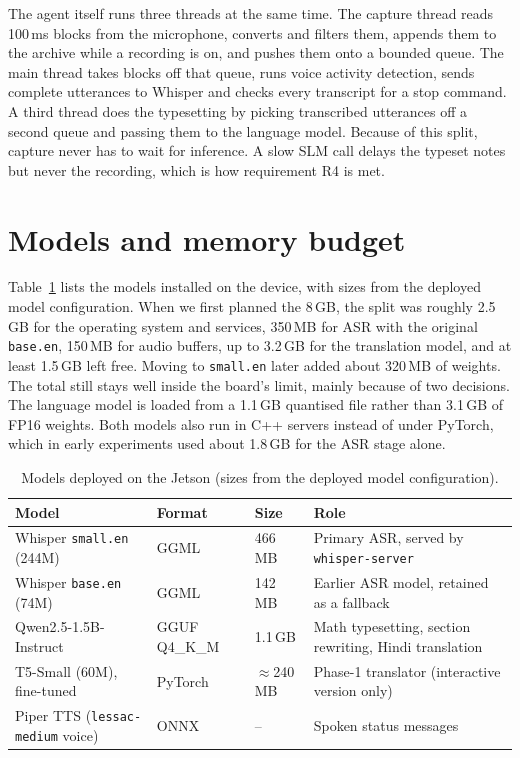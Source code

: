 \documentclass[11pt,a4paper,oneside]{report}
\theoremstyle{definition}
\newcommand{\code}[1]{\texttt{\small #1}}
\begin{document}
The agent itself runs three threads at the same time. The capture thread reads 100\,ms blocks from the microphone, converts and filters them, appends them to the archive while a recording is on, and pushes them onto a bounded queue. The main thread takes blocks off that queue, runs voice activity detection, sends complete utterances to Whisper and checks every transcript for a stop command. A third thread does the typesetting by picking transcribed utterances off a second queue and passing them to the language model. Because of this split, capture never has to wait for inference. A slow SLM call delays the typeset notes but never the recording, which is how requirement R4 is met.

\section{Models and memory budget}
Table~\ref{tab:models} lists the models installed on the device, with sizes from the deployed model configuration. When we first planned the 8\,GB, the split was roughly 2.5\,GB for the operating system and services, 350\,MB for ASR with the original \code{base.en}, 150\,MB for audio buffers, up to 3.2\,GB for the translation model, and at least 1.5\,GB left free. Moving to \code{small.en} later added about 320\,MB of weights. The total still stays well inside the board's limit, mainly because of two decisions. The language model is loaded from a 1.1\,GB quantised file rather than 3.1\,GB of FP16 weights. Both models also run in C++ servers instead of under PyTorch, which in early experiments used about 1.8\,GB for the ASR stage alone.

\begin{table}[ht]
\centering\small
\caption{Models deployed on the Jetson (sizes from the deployed model configuration).}
\label{tab:models}
\begin{tabularx}{\textwidth}{@{}l l l >{\raggedright\arraybackslash}X@{}}
\toprule
\textbf{Model} & \textbf{Format} & \textbf{Size} & \textbf{Role} \\
\midrule
Whisper \texttt{small.en} (244M) & GGML & 466\,MB & Primary ASR, served by \texttt{whisper-server} \\
Whisper \texttt{base.en} (74M) & GGML & 142\,MB & Earlier ASR model, retained as a fallback \\
Qwen2.5-1.5B-Instruct & GGUF Q4\_K\_M & 1.1\,GB & Math typesetting, section rewriting, Hindi translation \\
T5-Small (60M), fine-tuned & PyTorch & $\approx$240\,MB & Phase-1 translator (interactive version only) \\
Piper TTS (\texttt{lessac-medium} voice) & ONNX & -- & Spoken status messages \\
\bottomrule
\end{tabularx}
\end{table}
\end{document}
